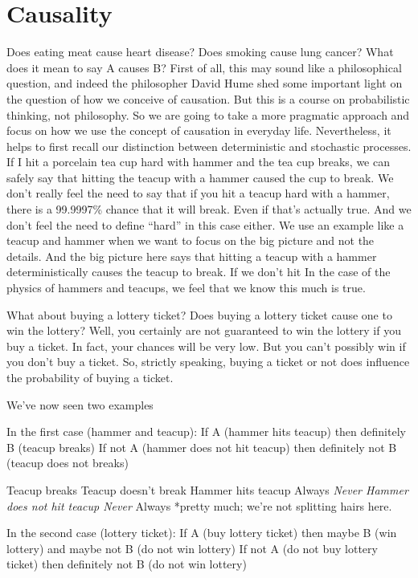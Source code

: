 \documentclass[]{book}
\begin{document}
\hypertarget{causality}{%
\section{Causality}\label{causality}}

Does eating meat cause heart disease? Does smoking cause lung cancer? What does it mean to say A causes B? First of all, this may sound like a philosophical question, and indeed the philosopher David Hume shed some important light on the question of how we conceive of causation. But this is a course on probabilistic thinking, not philosophy. So we are going to take a more pragmatic approach and focus on how we use the concept of causation in everyday life. Nevertheless, it helps to first recall our distinction between deterministic and stochastic processes. If I hit a porcelain tea cup hard with hammer and the tea cup breaks, we can safely say that hitting the teacup with a hammer caused the cup to break. We don't really feel the need to say that if you hit a teacup hard with a hammer, there is a 99.9997\% chance that it will break. Even if that's actually true. And we don't feel the need to define ``hard'' in this case either. We use an example like a teacup and hammer when we want to focus on the big picture and not the details. And the big picture here says that hitting a teacup with a hammer deterministically causes the teacup to break. If we don't hit In the case of the physics of hammers and teacups, we feel that we know this much is true.

What about buying a lottery ticket? Does buying a lottery ticket cause one to win the lottery? Well, you certainly are not guaranteed to win the lottery if you buy a ticket. In fact, your chances will be very low. But you can't possibly win if you don't buy a ticket. So, strictly speaking, buying a ticket or not does influence the probability of buying a ticket.

We've now seen two examples

In the first case (hammer and teacup):
If A (hammer hits teacup) then definitely B (teacup breaks)
If not A (hammer does not hit teacup) then definitely not B (teacup does not breaks)

Teacup breaks
Teacup doesn't break
Hammer hits teacup
Always\emph{
Never
Hammer does not hit teacup
Never}
Always
*pretty much; we're not splitting hairs here.

In the second case (lottery ticket):
If A (buy lottery ticket) then maybe B (win lottery) and maybe not B (do not win lottery)
If not A (do not buy lottery ticket) then definitely not B (do not win lottery)
\end{document}
